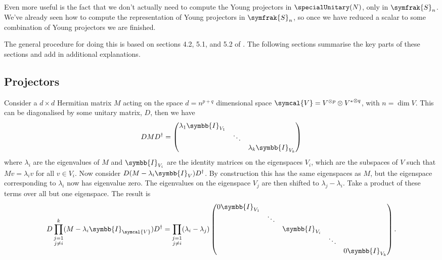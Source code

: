 \documentclass[fleqn]{NotesClass}
\newcommand{\identityMatrix}{\symbb{I}}
\newcommand{\symmetricGroup}[1][n]{\symfrak{S}_{#1}}
\newcommand{\hermit}{\dagger}
\newcommand{\dual}[1]{{#1^{*}}}
\begin{document}
    Even more useful is the fact that we don't actually need to compute the Young projectors in \(\specialUnitary(N)\), only in \(\symmetricGroup\).
    We've already seen how to compute the representation of Young projectors in \(\symmetricGroup\), so once we have reduced a scalar to some combination of Young projectors we are finished.
    
    The general procedure for doing this is based on sections 4.2, 5.1, and 5.2 of \cite{cvitanovic}.
    The following sections summarise the key parts of these sections and add in additional explanations.
    
    \subsection{Projectors}
    Consider a \(d \times d\) Hermitian matrix \(M\) acting on the space \(d = n^{p + q}\) dimensional space \(\symcal{V} = V^{\otimes p} \otimes \dual{V}^{\otimes q}\), with \(n = \dim V\).
    This can be diagonalised by some unitary matrix, \(D\), then we have
    \begin{equation}
        DMD^{\hermit} = 
        \begin{pmatrix}
            \lambda_1\identityMatrix_{V_1} & & \\
            & \ddots & \\
            & & \lambda_k\identityMatrix_{V_k}
        \end{pmatrix}
    \end{equation}
    where \(\lambda_i\) are the eigenvalues of \(M\) and \(\identityMatrix_{V_i}\) are the identity matrices on the eigenspaces \(V_i\), which are the subspaces of \(V\) such that \(Mv = \lambda_iv\) for all \(v \in V_i\).
    Now consider \(D(M - \lambda_i\identityMatrix_V)D^{\hermit}\).
    By construction this has the same eigenspaces as \(M\), but the eigenspace corresponding to \(\lambda_i\) now has eigenvalue zero.
    The eigenvalues on the eigenspace \(V_j\) are then shifted to \(\lambda_j - \lambda_i\).
    Take a product of these terms over all but one eigenspace.
    The result is
    \begin{equation}
        D \prod_{\substack{j = 1\\ j \ne i}}^{k} (M - \lambda_i\identityMatrix_{\symcal{V}})D^\hermit = \prod_{\substack{j=1\\ j \ne i}} (\lambda_i - \lambda_j)
        \begin{pmatrix}
            0\identityMatrix_{V_1} \\
            & \ddots \\
            && \identityMatrix_{V_i} \\
            &&& \ddots \\
            &&&& 0\identityMatrix_{V_k}
        \end{pmatrix}
        .
    \end{equation}
\end{document}
